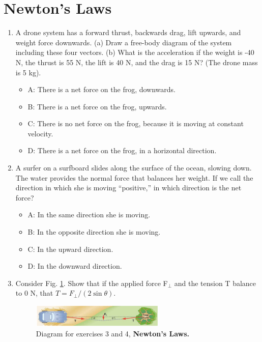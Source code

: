 \documentclass[10pt]{article}
\begin{document}
\section{Newton's Laws}
\begin{enumerate}
\small
\item A drone system has a forward thrust, backwards drag, lift upwards, and weight force downwards.  (a) Draw a free-body diagram of the system including these four vectors.  (b) What is the acceleration if the weight is -40 N, the thrust is 55 N, the lift is 40 N, and the drag is 15 N?  (The drone mass is 5 kg). \vspace{2cm}
\begin{itemize}
\item A: There is a net force on the frog, downwards.
\item B: There is a net force on the frog, upwards.
\item C: There is no net force on the frog, because it is moving at constant velocity.
\item D: There is a net force on the frog, in a horizontal direction.
\end{itemize}
\item A surfer on a surfboard slides along the surface of the ocean, slowing down.  The water provides the normal force that balances her weight.  If we call the direction in which she is moving ``positive,'' in which direction is the net force?
\begin{itemize}
\item A: In the same direction she is moving.
\item B: In the opposite direction she is moving.
\item C: In the upward direction.
\item D: In the downward direction.
\end{itemize}
\item Consider Fig. \ref{fig:car_pull}.  Show that if the applied force F$_{\perp}$ and the tension T balance to 0 N, that $T = F_{\perp}/(2\sin\theta)$. \vspace{2.5cm}
\begin{figure}
\centering
\includegraphics[width=0.6\textwidth]{figures/carpull.png}
\caption{\label{fig:car_pull} Diagram for exercises 3 and 4, \textbf{Newton's Laws.}}
\end{figure}

\end{enumerate}
\end{document}
